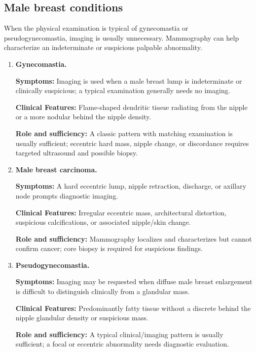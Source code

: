 \subsection{Male breast conditions}
When the physical examination is typical of gynecomastia or pseudogynecomastia, imaging is usually unnecessary. Mammography can help characterize an indeterminate or suspicious palpable abnormality.
\begin{enumerate}[leftmargin=*,itemsep=0.45em,topsep=0.4em]
\item \textbf{Gynecomastia.}\par\noindent\textbf{Symptoms:} Imaging is used when a male breast lump is indeterminate or clinically suspicious; a typical examination generally needs no imaging.\par\noindent\textbf{Clinical Features:} Flame-shaped dendritic tissue radiating from the nipple or a more nodular behind the nipple density.\par\noindent\textbf{Role and sufficiency:} A classic pattern with matching examination is usually sufficient; eccentric hard mass, nipple change, or discordance requires targeted ultrasound and possible biopsy.
\item \textbf{Male breast carcinoma.}\par\noindent\textbf{Symptoms:} A hard eccentric lump, nipple retraction, discharge, or axillary node prompts diagnostic imaging.\par\noindent\textbf{Clinical Features:} Irregular eccentric mass, architectural distortion, suspicious calcifications, or associated nipple/skin change.\par\noindent\textbf{Role and sufficiency:} Mammography localizes and characterizes but cannot confirm cancer; core biopsy is required for suspicious findings.
\item \textbf{Pseudogynecomastia.}\par\noindent\textbf{Symptoms:} Imaging may be requested when diffuse male breast enlargement is difficult to distinguish clinically from a glandular mass.\par\noindent\textbf{Clinical Features:} Predominantly fatty tissue without a discrete behind the nipple glandular density or suspicious mass.\par\noindent\textbf{Role and sufficiency:} A typical clinical/imaging pattern is usually sufficient; a focal or eccentric abnormality needs diagnostic evaluation.
\end{enumerate}

